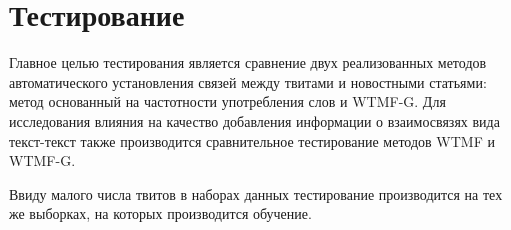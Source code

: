 \section{Тестирование}
    Главное целью тестирования является сравнение двух реализованных методов автоматического установления связей между твитами и новостными статьями:
    метод основанный на частотности употребления слов и WTMF-G.
    Для исследования влияния на качество добавления информации о взаимосвязях вида текст-текст также производится сравнительное тестирование методов WTMF и WTMF-G.

    Ввиду малого числа твитов в наборах данных тестирование производится на тех же выборках, на которых производится обучение.

    
    
    



